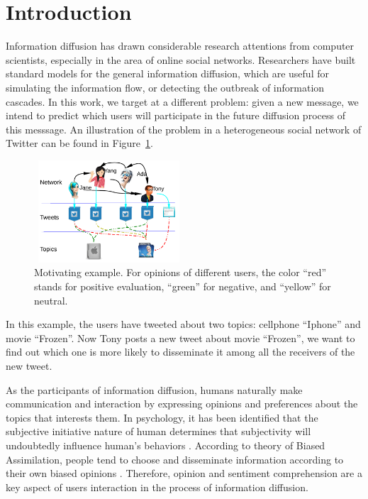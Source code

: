 \documentclass[letterpaper]{article}
\begin{document}
\section{Introduction}
\label{introduction}
\noindent Information diffusion has drawn considerable research attentions from computer scientists, especially in the area of online social networks. Researchers have built standard models for the general information diffusion,  which are useful for simulating the information flow\cite{goldenberg2001talk,kempe2003maximizing}, or detecting the outbreak of information cascades\cite{cheng2014can}. In this work, we target at a different problem: given a new message, we intend to predict which users will participate in the future diffusion process of this messsage\cite{Bian2014}. 
An illustration of the problem in a heterogeneous social network of Twitter can be found in Figure~\ref{fig00}. 
\begin{figure}[htb]
\centering
\includegraphics[width=2.2in,height=1.5in]{Mexample.pdf}
\caption{Motivating example. For opinions of different users, the color ``red'' stands for positive evaluation, ``green'' for negative, and ``yellow'' for neutral.}
\label{fig00}
\end{figure}
In this example, the users have tweeted about two topics: cellphone ``Iphone'' and movie ``Frozen''. Now Tony posts a new tweet about movie ``Frozen'', we want to find out which one is more likely to disseminate it among all the receivers of the new tweet.

As the participants of information diffusion, humans naturally make communication and interaction by expressing opinions and preferences about the topics that interests them. In psychology, it has been identified that the subjective initiative nature of human determines that subjectivity will undoubtedly influence human's behaviors \cite{moore2008awareness}. According to theory of Biased Assimilation, people tend to choose and disseminate information according to their own biased opinions \cite{Hyman2000}. Therefore, opinion and sentiment comprehension are a key aspect of users interaction in the process of information diffusion. 
\end{document}

